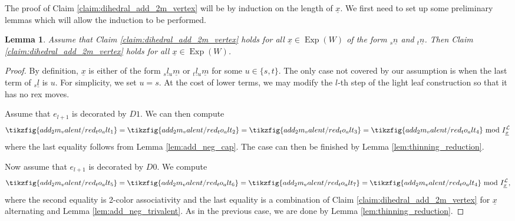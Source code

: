 \documentclass{amsart}
\newcommand{\scrL}{\mathcal{L}}
\DeclareMathOperator{\Exp}{Exp}
\newcommand{\ux}{\underline{x}}
\newtheorem{lemma}[subsubsection]{Lemma}
\theoremstyle{definition}
\numberwithin{equation}{subsection}
\begin{document}
The proof of Claim \ref{claim:dihedral_add_2m_vertex} will be by induction on the length of $\ux$. We first need to set up some preliminary lemmas which will allow the induction to be performed.

\begin{lemma}\label{lem:red_to_alternating}
    Assume that Claim \ref{claim:dihedral_add_2m_vertex} holds for all $\ux \in \Exp (W)$ of the form ${}_s \underline{n}$ and ${}_t \underline{n}$.
    Then Claim \ref{claim:dihedral_add_2m_vertex} holds for all $\ux \in \Exp (W)$.
\end{lemma}
\begin{proof}
    By definition, $\ux$ is either of the form ${}_s \underline{l} {}_u \underline{m}$ or  ${}_t \underline{l} {}_u \underline{m}$ for some $u \in \{s,t\}$.
    The only case not covered by our assumption is when the last term of ${}_s \underline{l}$ is $u$. For simplicity, we set $u = s$. 
    At the cost of lower terms, we may modify the $l$-th step of the light leaf construction so that it has no rex moves.
    
    Assume that $e_{l+1}$ is decorated by $D1$.
    We can then compute
    \begin{equation}
        \tikzfig{add_2m_valent/red_to_alt_1} =  \tikzfig{add_2m_valent/red_to_alt_2} = \tikzfig{add_2m_valent/red_to_alt_3} = \tikzfig{add_2m_valent/red_to_alt_4} \textnormal{ mod } I_{\ux}^{\scrL} 
    \end{equation}
    where the last equality follows from Lemma \ref{lem:add_neg_cap}. 
    The case can then be finished by Lemma \ref{lem:thinning_reduction}.

    Now assume that $e_{l+1}$ is decorated by $D0$. We compute
    \begin{equation}
        \tikzfig{add_2m_valent/red_to_alt_5} =  \tikzfig{add_2m_valent/red_to_alt_6} = \tikzfig{add_2m_valent/red_to_alt_7} = \tikzfig{add_2m_valent/red_to_alt_4} \textnormal{ mod } I_{\ux}^{\scrL},
    \end{equation}
    where the second equality is 2-color associativity and the last equality is a combination of Claim \ref{claim:dihedral_add_2m_vertex} for $\ux$ alternating and Lemma \ref{lem:add_neg_trivalent}.
    As in the previous case, we are done by Lemma \ref{lem:thinning_reduction}.
\end{proof} 
\end{document}
